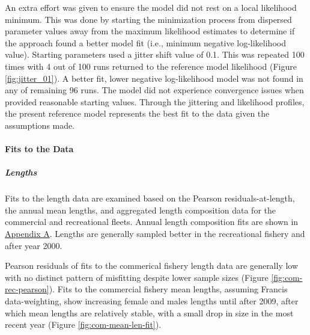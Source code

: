 \documentclass[11pt,
  english,
  a4paper,
]{article}
\begin{document}

An extra effort was given to ensure the model did not rest on a local likelihood minimum. This was done by starting the minimization process from dispersed parameter values away from the maximum likelihood estimates to determine if the approach found a better model fit (i.e., minimum negative log-likelihood value). Starting parameters used a jitter shift value of 0.1. This was repeated 100 times with 4 out of 100 runs returned to the reference model likelihood (Figure \ref{fig:jitter_01}). A better fit, lower negative log-likelihood model was not found in any of remaining 96 runs. The model did not experience convergence issues when provided reasonable starting values. Through the jittering and likelihood profiles, the present reference model represents the best fit to the data given the assumptions made.

\leavevmode\tagmcend\tagstructend\par


\hypertarget{fits-to-the-data}{%
\paragraph{Fits to the Data}\label{fits-to-the-data}}

\leavevmode\tagmcend\tagstructend


\hypertarget{lengths-2}{%
\subparagraph{Lengths}\label{lengths-2}}

\leavevmode\tagmcend\tagstructend


Fits to the length data are examined based on the Pearson residuals-at-length, the annual mean lengths, and aggregated length composition data for the commercial and recreational fleets. Annual length composition fits are shown in {\protect\hyperlink{app_a}{Appendix A}\leavevmode\tagmcend\tagstructend}. Lengths are generally sampled better in the recreational fishery and after year 2000.

\leavevmode\tagmcend\tagstructend\par


Pearson residuals of fits to the commerical fishery length data are generally low with no distinct pattern of misfitting despite lower sample sizes (Figure \ref{fig:com-rec-pearson}). Fits to the commercial fishery mean lengths, assuming Francis data-weighting, show increasing female and males lengths until after 2009, after which mean lengths are relatively stable, with a small drop in size in the most recent year (Figure \ref{fig:com-mean-len-fit}).
\end{document}
